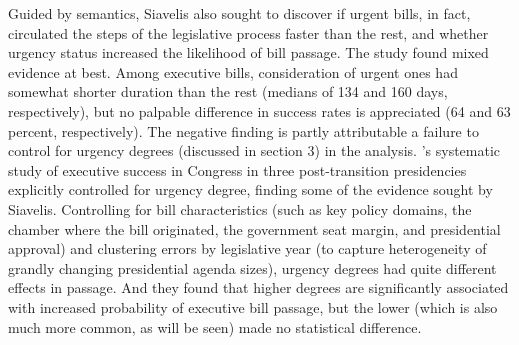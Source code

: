 \documentclass[letter,12pt]{article}
\begin{document}
Guided by semantics, Siavelis also sought to discover if urgent bills, in fact, circulated the steps of the legislative process faster than the rest, and whether urgency status increased the likelihood of bill passage. The study found mixed evidence at best. Among executive bills, consideration of urgent ones had somewhat shorter duration than the rest (medians of 134 and 160 days, respectively), but no palpable difference in success rates is appreciated (64 and 63 percent, respectively). The negative finding is partly attributable a failure to control for urgency degrees (discussed in section 3) in the analysis. \citeauthor{aleman.navia.UrgChi.2009}'s \citeyearpar{aleman.navia.UrgChi.2009} systematic study of executive success in Congress in three post-transition presidencies explicitly controlled for urgency degree, finding some of the evidence sought by Siavelis. Controlling for bill characteristics (such as key policy domains, the chamber where the bill originated, the government seat margin, and presidential approval) and clustering errors by legislative year (to capture heterogeneity of grandly changing presidential agenda sizes), urgency degrees had quite different effects in passage. And they found that higher degrees are significantly associated with increased probability of executive bill passage, but the lower (which is also much more common, as will be seen) made no statistical difference. 

\end{document}
